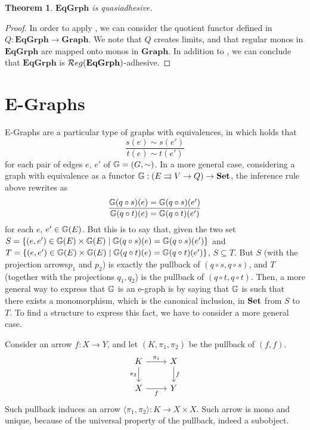 \documentclass[a4paper, twoside,openright]{report}
\theoremstyle{plain}
\newtheorem{theorem}{Theorem}[section]
\theoremstyle{definition}
\begin{document}
\begin{theorem}
    $\mathbf{EqGrph}$ is quasiadhesive.
\end{theorem}

\begin{proof}
    In order to apply , we can consider the quotient functor defined in  $Q: \mathbf{EqGrph \rightarrow Graph}$. We note that $Q$ creates limits, and that regular monos in $\mathbf{EqGrph}$ are mapped onto monos in $\mathbf{Graph}$. In addition to , we can conclude that $\mathbf{EqGrph}$ is $\mathcal{R}eg(\mathbf{EqGrph})$-adhesive.
\end{proof}


\section{E-Graphs}\label{sect:eggs}

E-Graphs are a particular type of graphs with equivalences, in which holds that
$$
    \frac{s(e) \sim s(e')}{t(e) \sim t(e')}
$$
for each pair of edges $e$, $e'$ of $\mathbb{G} = (G, \sim)$.
In a more general case, considering a graph with equivalence as a functor $\mathbb{G} : (E \rightrightarrows V \rightarrow Q) \rightarrow \mathbf{Set}$, the inference rule above rewrites as
\[
    \frac{\mathbb{G}(q \circ s)(e) = \mathbb{G}(q \circ s)(e')}{\mathbb{G}(q \circ t)(e) = \mathbb{G}(q \circ t)(e')}
\] for each $e$, $e' \in \mathbb{G}(E)$.
But this is to say that, given the two set $S = \{ (e, e') \in \mathbb{G}(E) \times \mathbb{G}(E) \mid \mathbb{G}(q \circ s)(e) = \mathbb{G}(q \circ s)(e') \}$ and $T =\{ (e, e') \in \mathbb{G}(E) \times \mathbb{G}(E) \mid \mathbb{G}(q \circ t)(e) = \mathbb{G}(q \circ t)(e') \} $, $S \subseteq T$. But $S$ (with the projection arrows$p_1$ and $p_2$) is exactly the pullback of $(q \circ s, q \circ s)$, and $T$ (together with the projections $q_1, q_2$) is the pullback of $(q \circ t, q \circ t)$. Then, a more general way to express that $\mathbb{G}$ is an e-graph is by saying that $\mathbb{G}$ is such that there exists a monomorphism, which is the canonical inclusion, in $\mathbf{Set}$ from $S$ to $T$.
To find a structure to express this fact, we have to consider a more general case.

Consider an arrow $f: X \rightarrow Y$, and let $(K, \pi_1, \pi_2)$ be the pullback of $(f, f)$.
\[
    \begin{tikzcd}
        K \arrow[r, "{\pi_1}"] \arrow[d, "{\pi_2}"swap] & X \arrow[d, "f"] \\
        X \arrow[r, "f"swap] & Y
    \end{tikzcd}
\]
Such pullback induces an arrow $\langle \pi_1, \pi_2 \rangle : K \rightarrow X\times X$. Such arrow is mono and unique, because of the universal property of the pullback, indeed a subobject.
\end{document}
